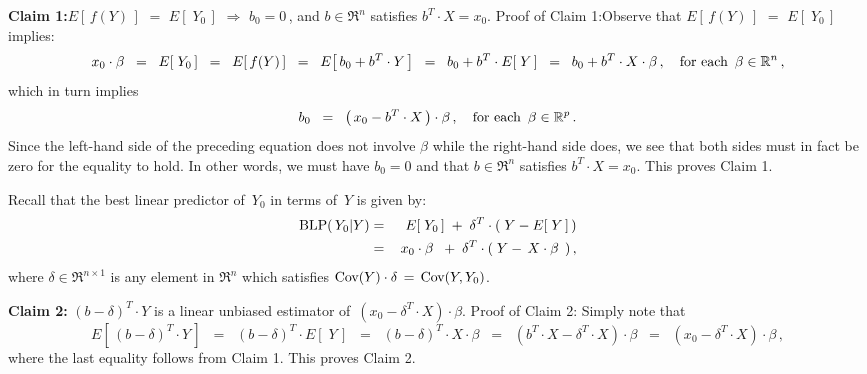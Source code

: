 \vskip 0.3cm
\noindent
\textbf{Claim 1:}\quad $E\!\left[\,f(Y)\,\right]$ $=$ $E\!\left[\;Y_{0}\,\right]$
\;\;$\Longrightarrow$\;\; $b_{0} = 0$\,, \;and\; $b \in \Re^{n}$ satisfies $b^{T}\cdot X = x_{0}$.
\mbox{}\vskip 0.2cm\noindent
Proof of Claim 1:\quad Observe that $E\!\left[\,f(Y)\,\right]$ $=$ $E\!\left[\;Y_{0}\,\right]$ implies:
\begin{equation*}
x_{0} \cdot \beta
\;\; = \;\;
	E\!\left[\;Y_{0}\,\right]
\;\; = \;\;
	E\!\left[\,f(Y)\,\right]
\;\; = \;\;
	E\!\left[\,b_{0} + b^{T}\cdot Y\,\right]
\;\; = \;\;
	b_{0} + b^{T}\cdot E\!\left[\;Y\,\right]
\;\; = \;\;
	b_{0} + b^{T}\cdot X \cdot \beta\,,
	\quad
	\textnormal{for each \,$\beta\in\Re^{n}$}\,,
\end{equation*}
which in turn implies
\begin{equation*}
b_{0}
\;\; = \;\;
	\left(\,x_{0} - b^{T}\cdot X\,\right) \cdot \beta\,,
	\quad
	\textnormal{for each \,$\beta\in\Re^{p}$}\,.
\end{equation*}
Since the left-hand side of the preceding equation does not involve $\beta$
while the right-hand side does, we see that both sides must in fact be zero for the equality to hold.
In other words, we must have $b_{0} = 0$ and that $b \in \Re^{n}$ satisfies $b^{T} \cdot X = x_{0}$.
This proves Claim 1.

\vskip 0.5cm
\noindent
Recall that the best linear predictor of \,$Y_{0}$ in terms of \,$Y$ is given by:
\begin{eqnarray*}
\blp(\,Y_{0}\vert Y)
& = &
	E\!\left[\;Y_{0}\,\right] \; + \; \delta^{T}\cdot(\;Y - E\!\left[\;Y\,\right]\,)
\\
& = &
	\,x_{0}\cdot\beta{\color{white}.} \; + \; \delta^{T}\cdot(\;Y - \,X\cdot\beta\,\;)\,,
\end{eqnarray*}
where $\delta \in \Re^{n \times 1}$ is any element in $\Re^{n}$ which satisfies
$\Cov(Y) \cdot \delta \,=\, \Cov(Y,Y_{0})$.

\vskip 0.5cm
\noindent
\textbf{Claim 2:}\quad
$(b - \delta)^{T}\cdot Y$ is a linear unbiased estimator of \,$(x_{0} - \delta^{T}\cdot X)\cdot\beta$.
\vskip 0.2cm
\noindent
Proof of Claim 2:\quad
Simply note that
\begin{equation*}
E\!\left[\,(b - \delta)^{T}\cdot Y\,\right]
\;\; = \;\;
	(b - \delta)^{T} \cdot E\!\left[\;Y\,\right]
\;\; = \;\;
	(b - \delta)^{T} \cdot X \cdot \beta
\;\; = \;\;
	(b^{T}\cdot X - \delta^{T} \cdot X) \cdot \beta
\;\; = \;\;
	(x_{0} - \delta^{T} \cdot X) \cdot \beta\,,
\end{equation*}
where the last equality follows from Claim 1.
This proves Claim 2.

